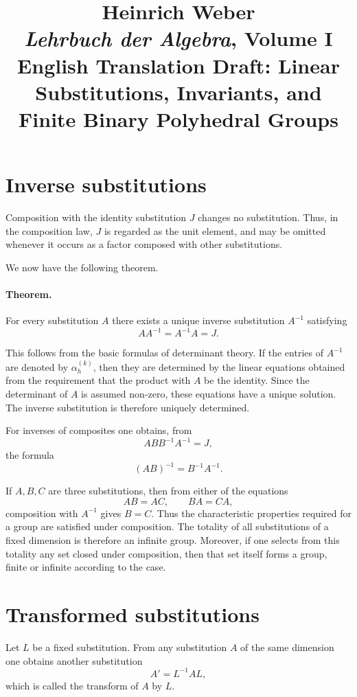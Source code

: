 \documentclass[11pt]{article}
\title{Heinrich Weber\\\textit{Lehrbuch der Algebra}, Volume I\\English Translation Draft: Linear Substitutions, Invariants, and Finite Binary Polyhedral Groups}
\author{}
\date{}
\begin{document}
\maketitle

\section*{Inverse substitutions}
Composition with the identity substitution $J$ changes no substitution.  Thus, in the composition law, $J$ is regarded as the unit element, and may be omitted whenever it occurs as a factor composed with other substitutions.

We now have the following theorem.

\paragraph{Theorem.} For every substitution $A$ there exists a unique inverse substitution $A^{-1}$ satisfying
\begin{equation}\label{eq:weber8-inverse}
AA^{-1}=A^{-1}A=J.
\end{equation}

This follows from the basic formulas of determinant theory.  If the entries of $A^{-1}$ are denoted by $\alpha_h^{(k)}$, then they are determined by the linear equations obtained from the requirement that the product with $A$ be the identity.  Since the determinant of $A$ is assumed non-zero, these equations have a unique solution.  The inverse substitution is therefore uniquely determined.

For inverses of composites one obtains, from
\[
ABB^{-1}A^{-1}=J,
\]
the formula
\begin{equation}\label{eq:weber8-composite-inverse}
(AB)^{-1}=B^{-1}A^{-1}.
\end{equation}

If $A,B,C$ are three substitutions, then from either of the equations
\[
AB=AC,\qquad BA=CA,
\]
composition with $A^{-1}$ gives $B=C$.  Thus the characteristic properties required for a group are satisfied under composition.  The totality of all substitutions of a fixed dimension is therefore an infinite group.  Moreover, if one selects from this totality any set closed under composition, then that set itself forms a group, finite or infinite according to the case.

\section*{Transformed substitutions}
Let $L$ be a fixed substitution.  From any substitution $A$ of the same dimension one obtains another substitution
\begin{equation}\label{eq:weber8-transform}
A'=L^{-1}AL,
\end{equation}
which is called the transform of $A$ by $L$.
\end{document}
